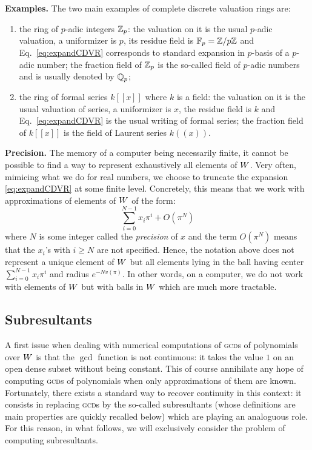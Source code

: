 \documentclass{sig-alternate}
\begin{document}
\medskip

\noindent
\textbf{Examples.}
The two main examples of complete discrete valuation rings are:
\begin{enumerate}[(1)]
\vspace{-0.25cm}
\item the ring of $p$-adic integers $\mathbb Z_p$: the valuation on it is
the usual $p$-adic valuation, a uniformizer is $p$, its residue
field is $\mathbb F_p = \mathbb Z/p\mathbb Z$ and Eq.~\eqref{eq:expandCDVR} corresponds
to standard expansion in $p$-basis of a $p$-adic number; the fraction 
field of $\mathbb Z_p$ is the so-called field of $p$-adic numbers and is usually 
denoted by $\mathbb Q_p$;
\vspace{-0.25cm}
\item the ring of formal series $k[[x]]$ where $k$ is a field: the
valuation on it is the usual valuation of series, a uniformizer is
$x$, the residue field is $k$ and Eq.~\eqref{eq:expandCDVR} is the
usual writing of formal series; the fraction field of $k[[x]]$ is
the field of Laurent series $k((x))$.
\end{enumerate}
\vspace{-0.2cm}

\medskip

\noindent
\textbf{Precision.}
The memory of a computer being necessarily finite, it cannot be possible 
to find a way to represent exhaustively all elements of $W$. 
Very often, mimicing what we do for real numbers, we choose to truncate 
the expansion \eqref{eq:expandCDVR} at some finite level. Concretely,
this means that we work with approximations of elements of $W$ of the
form:
$$\sum_{i=0}^{N-1} x_i \pi^i + O(\pi^N)$$
where $N$ is some integer called the \emph{precision} of $x$ and 
the term $O(\pi^N)$ means that the $x_i$'s with $i \geq N$ are not 
specified. Hence, the notation above does not represent a unique
element of $W$ but all elements lying in the ball having center
$\sum_{i=0}^{N-1} x_i \pi^i$ and radius $e^{-N v(\pi)}$. In other
words, on a computer, we do not work with elements of $W$ but with
balls in $W$ which are much more tractable.

\subsection{Subresultants}

A first issue when dealing with numerical computations of \textsc{gcd}s 
of polynomials over $W$ is that the $\gcd$ function is not continuous: 
it takes the value $1$ on an open dense subset without being constant. 
This of course annihilate any hope of computing \textsc{gcd}s of 
polynomials when only approximations of them are known. Fortunately, 
there exists a standard way to recover continuity in this context: it 
consists in replacing \textsc{gcd}s by the so-called subresultants 
(whose definitions are main properties are quickly recalled below) which 
are playing an analoguous role. For this reason, in what follows, we 
will exclusively consider the problem of computing subresultants.
\end{document}
